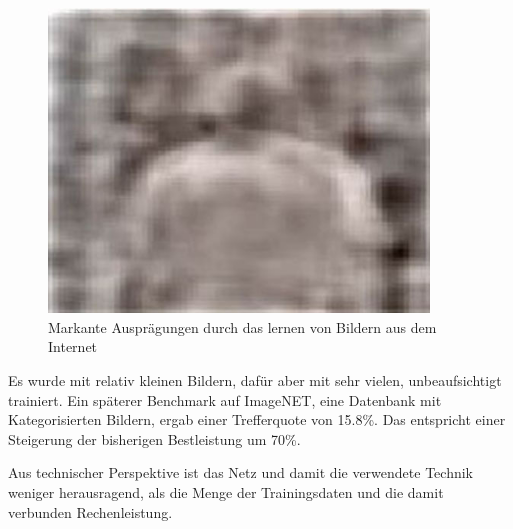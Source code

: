 \begin{figure}
{\begin{minipage}{0.33\textwidth}
	\includegraphics[width=0.9\textwidth]{images/neuron-body.jpg}\end{minipage}}
\caption{Markante Ausprägungen durch das lernen von Bildern aus dem Internet \citep{googleimage}}
\label{fig:neurons-google}
\end{figure}

Es wurde mit relativ kleinen Bildern, dafür aber mit sehr vielen, unbeaufsichtigt trainiert. Ein späterer Benchmark auf ImageNET, eine Datenbank mit Kategorisierten Bildern, ergab einer Trefferquote von 15.8\%. Das entspricht einer Steigerung der bisherigen Bestleistung um 70\%.

Aus technischer Perspektive ist das Netz und damit die verwendete Technik weniger herausragend, als die Menge der Trainingsdaten und die damit verbunden Rechenleistung.

